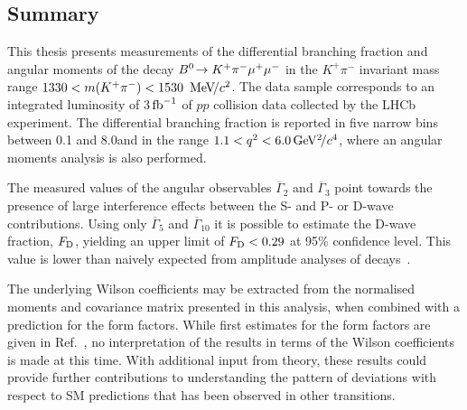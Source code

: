 \subsection{Summary}

This thesis presents measurements of the differential branching fraction and angular moments of the decay ${B}^0\!\rightarrow K^{+}\pi^{-}\mu^{+}\mu^{-}$ in the $K^{+}\pi^{-}$ invariant mass range \mbox{$1330<m({{K}^+}{{\pi}^-})<1530~\mathrm{\,Me\kern -0.1em V\!/}c^{2}$}.  The data sample corresponds to an integrated luminosity of 3$\ensuremath{\mbox{\,fb}^{-1}}\xspace$ of $pp$ collision data collected by the LHCb experiment.  The differential branching fraction is reported in five narrow \qsq bins between 0.1 and 8.0\gevgevcccc and in the range $1.1<{q^2}<6.0{\mathrm{\,Ge\kern -0.1em V^2\!/}c^4}$, where an angular moments analysis is also performed.

The measured values of the angular observables $\overline{\Gamma}_{2}$ and $\overline{\Gamma}_{3}$ point towards the presence of large interference effects between the S- and P- or D-wave contributions. Using only $\overline{\Gamma}_{5}$ and $\overline{\Gamma}_{10}$ it is possible to estimate the D-wave fraction, $F_{\rm D}$,  yielding an upper limit of $F_{\rm D}<0.29$ at 95\% confidence level. This value is lower than naively expected from amplitude analyses of \BdToJPsiKpi decays~\cite{belle-z-paper}.

The underlying Wilson coefficients may be extracted from the normalised moments and covariance matrix presented in this analysis, when combined with a prediction for the form factors. While first estimates for the form factors are given in Ref.~\cite{lu-wang}, no interpretation of the results in terms of the Wilson coefficients is made at this time. With additional input from theory, these results could provide further contributions to understanding the pattern of deviations with respect to SM predictions that has been observed in other \btosmm transitions.